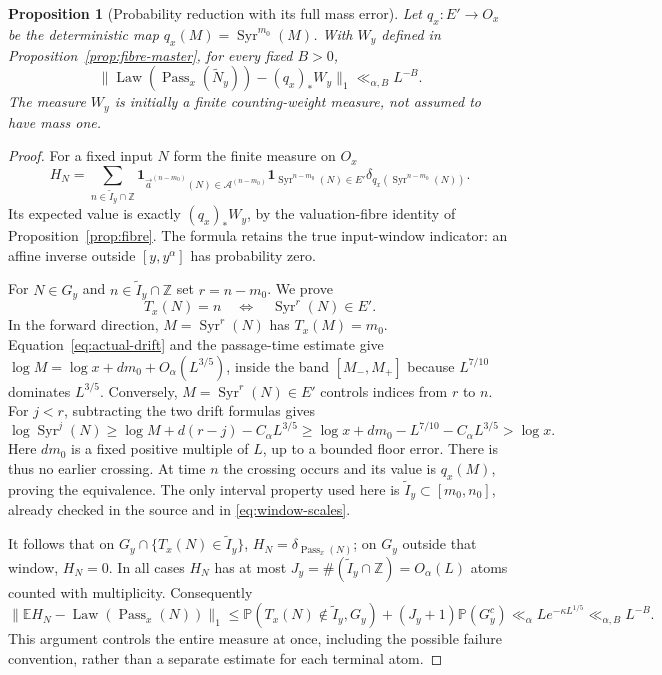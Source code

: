 \documentclass[11pt]{article}
\newtheorem{proposition}{Proposition}
\theoremstyle{remark}\newtheorem{remark}[proposition]{Remark}
\newcommand{\PP}{\mathbb P}
\newcommand{\EE}{\mathbb E}
\newcommand{\ZZ}{\mathbb Z}
\newcommand{\Syr}{\operatorname{Syr}}
\newcommand{\one}{\mathbf 1}
\begin{document}
\begin{proposition}[Probability reduction with its full mass error]
\label{prop:actual-reduction}
Let $q_x:E'\to O_x$ be the deterministic map
$q_x(M)=\Syr^{m_0}(M)$. With $W_y$ defined in
Proposition~\ref{prop:fibre-master}, for every fixed $B>0$,
\begin{equation}\label{eq:actual-reduction}
 \|\operatorname{Law}(\operatorname{Pass}_x(\widetilde N_y))
                  -(q_x)_*W_y\|_1\ll_{\alpha,B}L^{-B}.
\end{equation}
The measure $W_y$ is initially a finite counting-weight measure, not
assumed to have mass one.
\end{proposition}
\begin{proof}
For a fixed input $N$ form the finite measure on $O_x$
\[
 H_N=\sum_{n\in\widetilde I_y\cap\ZZ}
 \one_{\vec a^{(n-m_0)}(N)\in\mathcal A^{(n-m_0)}}
 \one_{\Syr^{n-m_0}(N)\in E'}
 \delta_{q_x(\Syr^{n-m_0}(N))}.
\]
Its expected value is exactly $(q_x)_*W_y$, by the valuation-fibre
identity of Proposition~\ref{prop:fibre}. The formula retains the
true input-window indicator: an affine inverse outside $[y,y^\alpha]$
has probability zero.

For $N\in G_y$ and $n\in\widetilde I_y\cap\ZZ$ set $r=n-m_0$.
We prove
\[
 T_x(N)=n\quad\Longleftrightarrow\quad \Syr^r(N)\in E'.
\]
In the forward direction, $M=\Syr^r(N)$ has $T_x(M)=m_0$.
Equation~\eqref{eq:actual-drift} and the passage-time estimate give
$\log M=\log x+dm_0+O_\alpha(L^{3/5})$, inside the band
$[M_-,M_+]$ because $L^{7/10}$ dominates $L^{3/5}$.
Conversely, $M=\Syr^r(N)\in E'$ controls indices from $r$ to $n$.
For $j<r$, subtracting the two drift formulas gives
\[
 \log\Syr^j(N)\ge\log M+d(r-j)-C_\alpha L^{3/5}
 \ge \log x+dm_0-L^{7/10}-C_\alpha L^{3/5}>\log x .
\]
Here $dm_0$ is a fixed positive multiple of $L$, up to a bounded
floor error. There is thus no earlier crossing. At time $n$ the
crossing occurs and its value is $q_x(M)$, proving the equivalence.
The only interval property used here is
$\widetilde I_y\subset[m_0,n_0]$, already checked in the source
and in \eqref{eq:window-scales}.

It follows that on $G_y\cap\{T_x(N)\in\widetilde I_y\}$,
$H_N=\delta_{\operatorname{Pass}_x(N)}$; on $G_y$ outside that
window, $H_N=0$. In all cases $H_N$ has at most
$J_y=\#(\widetilde I_y\cap\ZZ)=O_\alpha(L)$ atoms counted with
multiplicity. Consequently
\[
 \|\EE H_N-\operatorname{Law}(\operatorname{Pass}_x(N))\|_1
 \le \PP(T_x(N)\notin\widetilde I_y,G_y)
          +(J_y+1)\PP(G_y^c)
 \ll_\alpha L e^{-\kappa L^{1/5}}\ll_{\alpha,B}L^{-B}.
\]
This argument controls the entire measure at once, including the
possible failure convention, rather than a separate estimate for
each terminal atom.
\end{proof}
\end{document}
